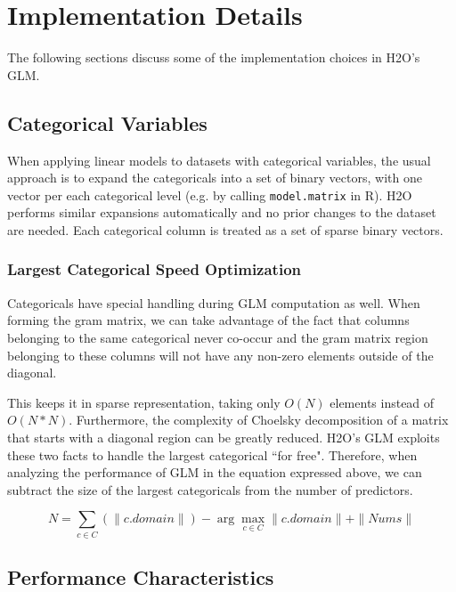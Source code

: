 \section{Implementation Details}

The following sections discuss some of the implementation choices in H2O's GLM.

\subsection{Categorical Variables}

When applying linear models to datasets with categorical variables, the usual approach is to expand the
categoricals into a set of binary vectors, with one vector per each categorical level (e.g. by calling
{\texttt{model.matrix}} in R). H2O performs similar expansions automatically and no prior changes to the dataset
are needed. Each categorical column is treated as a set of sparse binary vectors.

\subsubsection{Largest Categorical Speed Optimization}

Categoricals have special handling during GLM computation as well. When forming the gram matrix, we can take
advantage of the fact that columns belonging to the same categorical never co-occur and the gram matrix region
belonging to these columns will not have any non-zero elements outside of the diagonal. 

This keeps it in sparse representation, taking only $O(N)$ elements instead of $O(N*N)$. Furthermore, the complexity of Choelsky
decomposition of a matrix that starts with a diagonal region can be greatly reduced. H2O's GLM exploits these two
facts to handle the largest categorical ``for free". Therefore, when analyzing the performance of GLM in the
equation expressed above, we can subtract the size of the largest categoricals from the number of predictors.

$$N = \sum_{c \in C} (\|c.domain\|) - \arg\max_{c \in C} \|c.domain\| + \|Nums\| $$

\subsection{Performance Characteristics}

